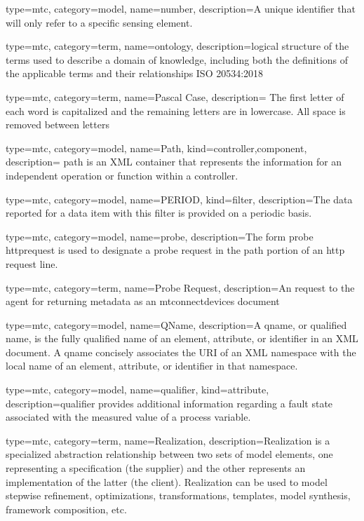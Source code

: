 {
  type=mtc,
  category=model,
  name={number},
  description={A unique identifier that will only refer to a specific \gls{sensing element}.}
}


{
  type=mtc,
  category=term,
  name={ontology},
  description={logical structure of the terms used to describe a domain of knowledge, including both the definitions of the applicable terms and their relationships ISO 20534:2018}
}


{
  type=mtc,
  category=term,
  name={Pascal Case},
  description= {The first letter of each word is capitalized and the remaining letters are in lowercase. All space is removed between letters}
}


{
  type=mtc,
  category=model,
  name={Path},
  kind={controller,component},
  description= {\gls{path} is an XML container that represents the information for an independent operation or function within a \gls{controller}.}
}


{
  type=mtc,
  category=model,
  name={PERIOD},
  kind={filter},
  description={The data reported for a data item with this \gls{filter} is provided on a periodic basis.}
}



{
  type=mtc,
  category=model,
  name={probe},
  description={The form \gls{probe httprequest} is used to designate a \gls{probe request} in the path portion of an \gls{http request line}.}
}


{
  type=mtc,
  category=term,
  name={Probe Request},
  description={An  request to the \gls{agent} for returning metadata as an \gls{mtconnectdevices}  document}
}


{
  type=mtc,
  category=model,
  name={QName},
  description={A \gls{qname}, or qualified name, is the fully qualified name of an element, attribute, or identifier in an XML document. A  \gls{qname} concisely associates the URI of an XML namespace with the local name of an element, attribute, or identifier in that namespace.}
}


{
  type=mtc,
  category=model,
  name={qualifier},
  kind={attribute},
  description={\gls{qualifier} provides additional information regarding a \gls{fault state} associated with the measured value of a process variable.}
}


{
  type=mtc,
  category=term,
  name={Realization},
  description={Realization is a specialized abstraction relationship between two sets of model elements, one representing a specification (the supplier) and the other represents an implementation of the latter (the client). Realization can be used to model stepwise refinement, optimizations, transformations, templates, model synthesis, framework composition, etc.}
}


